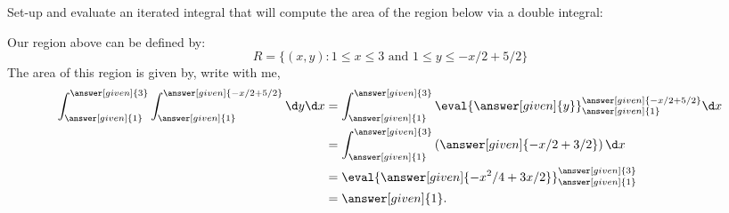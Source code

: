 \documentclass{ximera}
\begin{document}
\begin{example}
  Set-up and evaluate an iterated integral that will compute the area
  of the region below via a double integral:
  \begin{image}
  \end{image}
  \begin{explanation}
    Our region above can be defined by:
    \[
    R=\{(x,y):\text{$1\leq x\leq 3$ and $1\leq y\leq -x/2+5/2$}\}
    \]
    The area of this region is given by, write with me, 
    \begin{align*}
      \int_{\answer[given]{1}}^{\answer[given]{3}}\int_{\answer[given]{1}}^{\answer[given]{-x/2+5/2}}\d y \d x &= \int_{\answer[given]{1}}^{\answer[given]{3}} \eval{\answer[given]{y}}_{\answer[given]{1}}^{\answer[given]{-x/2+5/2}} \d x\\
      &=  \int_{\answer[given]{1}}^{\answer[given]{3}} \left(\answer[given]{-x/2+3/2}\right) \d x\\
      &=  \eval{\answer[given]{-x^2/4+3x/2}}_{\answer[given]{1}}^{\answer[given]{3}}\\
      &= \answer[given]{1}. 
    \end{align*}
  \end{explanation}
\end{example}
\end{document}
